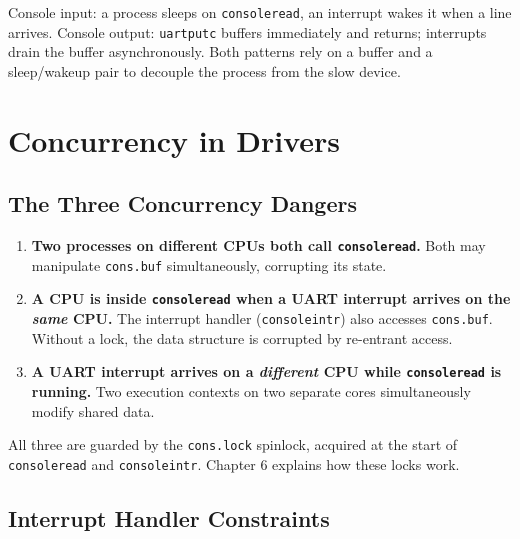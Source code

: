 \documentclass[11pt, a4paper]{article}
\begin{document}
\begin{tcolorbox}[summary, title={Section Summary}]
Console input: a process sleeps on \lstinline|consoleread|, an interrupt wakes it when a line arrives. Console output: \lstinline|uartputc| buffers immediately and returns; interrupts drain the buffer asynchronously. Both patterns rely on a buffer and a sleep/wakeup pair to decouple the process from the slow device.
\end{tcolorbox}

\section{Concurrency in Drivers}

\subsection{The Three Concurrency Dangers}

\begin{tcolorbox}[warning, title={Three Concurrency Hazards in the Console Driver}]
\begin{enumerate}[leftmargin=1.8em, itemsep=0.3em]
  \item \textbf{Two processes on different CPUs both call \lstinline|consoleread|.}
        Both may manipulate \lstinline|cons.buf| simultaneously, corrupting its state.

  \item \textbf{A CPU is inside \lstinline|consoleread| when a UART interrupt arrives on the \emph{same} CPU.}
        The interrupt handler (\lstinline|consoleintr|) also accesses \lstinline|cons.buf|. Without a lock, the data structure is corrupted by re-entrant access.

  \item \textbf{A UART interrupt arrives on a \emph{different} CPU while \lstinline|consoleread| is running.}
        Two execution contexts on two separate cores simultaneously modify shared data.
\end{enumerate}
All three are guarded by the \lstinline|cons.lock| spinlock, acquired at the start of \lstinline|consoleread| and \lstinline|consoleintr|. Chapter 6 explains how these locks work.
\end{tcolorbox}

\subsection{Interrupt Handler Constraints}
\end{document}

